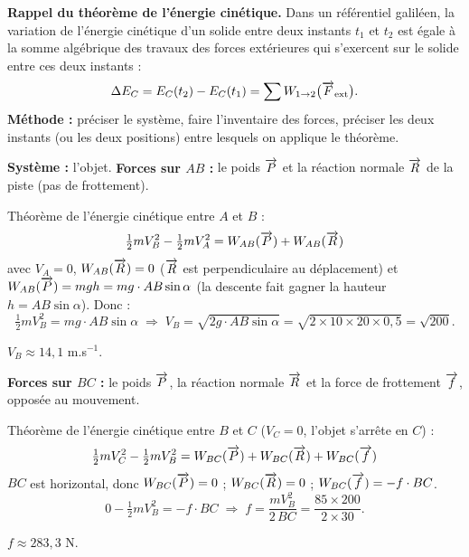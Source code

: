 \newcommand{\matiere}{Physique : théorème de l'énergie cinétique (correction)}




\begin{donnees}
\textbf{Rappel du théorème de l'énergie cinétique.} Dans un référentiel galiléen, la variation de
l'énergie cinétique d'un solide entre deux instants $t_1$ et $t_2$ est égale à la somme algébrique
des travaux des forces extérieures qui s'exercent sur le solide entre ces deux instants :
\[
\Delta E_C = E_C(t_2) - E_C(t_1) = \sum W_{1 \to 2}\big(\overrightarrow{F}_{\text{ext}}\big).
\]
\textbf{Méthode :} préciser le système, faire l'inventaire des forces, préciser les deux instants
(ou les deux positions) entre lesquels on applique le théorème.
\end{donnees}


\textbf{Système :} l'objet. \textbf{Forces sur $AB$ :} le poids $\overrightarrow{P}$ et la réaction normale
$\overrightarrow{R}$ de la piste (pas de frottement).

Théorème de l'énergie cinétique entre $A$ et $B$ :
\[
\tfrac{1}{2} m V_B^2 - \tfrac{1}{2} m V_A^2 = W_{AB}(\overrightarrow{P}) + W_{AB}(\overrightarrow{R})
\]
avec $V_A = 0$, $W_{AB}(\overrightarrow{R}) = 0$ ($\overrightarrow{R}$ est perpendiculaire au déplacement) et
$W_{AB}(\overrightarrow{P}) = m g h = m g \cdot AB \sin\alpha$ (la descente fait gagner la hauteur
$h = AB\sin\alpha$). Donc :
\[
\tfrac{1}{2} m V_B^2 = m g \cdot AB \sin\alpha
\;\Longrightarrow\;
V_B = \sqrt{2 g \cdot AB \sin\alpha} = \sqrt{2 \times 10 \times 20 \times 0,5} = \sqrt{200}.
\]
\begin{resultat}
$V_B \approx 14,1$ m.s$^{-1}$.
\end{resultat}

\textbf{Forces sur $BC$ :} le poids $\overrightarrow{P}$, la réaction normale $\overrightarrow{R}$ et la force de frottement
$\overrightarrow{f}$, opposée au mouvement.

Théorème de l'énergie cinétique entre $B$ et $C$ ($V_C = 0$, l'objet s'arrête en $C$) :
\[
\tfrac{1}{2} m V_C^2 - \tfrac{1}{2} m V_B^2 = W_{BC}(\overrightarrow{P}) + W_{BC}(\overrightarrow{R}) + W_{BC}(\overrightarrow{f})
\]
$BC$ est horizontal, donc $W_{BC}(\overrightarrow{P}) = 0$ ; $W_{BC}(\overrightarrow{R}) = 0$ ; $W_{BC}(\overrightarrow{f}) = -f \cdot BC$.
\[
0 - \tfrac{1}{2} m V_B^2 = - f \cdot BC
\;\Longrightarrow\;
f = \frac{m V_B^2}{2\,BC} = \frac{85 \times 200}{2 \times 30}.
\]
\begin{resultat}
$f \approx 283,3$ N.
\end{resultat}

